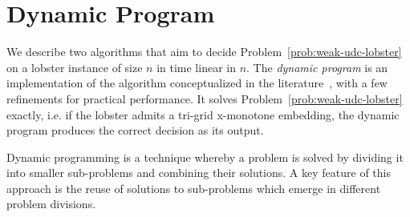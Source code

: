 \chapter{Dynamic Program}
\label{ch:dynprog}

We describe two algorithms that aim to decide Problem~\ref{prob:weak-udc-lobster} on a lobster instance of size $n$ in time linear in $n$. The \emph{dynamic program} is an implementation of the algorithm conceptualized in the literature~\cite{Bhore2021}, with a few refinements for practical performance. It solves Problem~\ref{prob:weak-udc-lobster} exactly, i.e. if the lobster admits a tri-grid x-monotone embedding, the dynamic program produces the correct decision as its output.

Dynamic programming is a technique whereby a problem is solved by dividing it into smaller sub-problems and combining their solutions.
A key feature of this approach is the reuse of solutions to sub-problems which emerge in different problem divisions.

